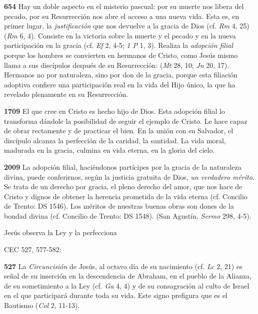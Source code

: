 \textbf{654} Hay un doble aspecto en el misterio pascual: por su muerte nos libera del pecado, por su Resurrección nos abre el acceso a una nueva vida. Esta es, en primer lugar, la \emph{justificación} que nos devuelve a la gracia de Dios (cf. \emph{Rm} 4, 25)  (\emph{Rm} 6, 4). Consiste en la victoria sobre la muerte y el pecado y en la nueva participación en la gracia (cf. \emph{Ef} 2, 4-5; \emph{1 P} 1, 3). Realiza la \emph{adopción filial} porque los hombres se convierten en hermanos de Cristo, como Jesús mismo llama a sus discípulos después de su Resurrección:  (\emph{Mt} 28, 10; \emph{Jn} 20, 17). Hermanos no por naturaleza, sino por don de la gracia, porque esta filiación adoptiva confiere una participación real en la vida del Hijo único, la que ha revelado plenamente en su Resurrección.

\textbf{1709} El que cree en Cristo es hecho hijo de Dios. Esta adopción filial lo transforma dándole la posibilidad de seguir el ejemplo de Cristo. Le hace capaz de obrar rectamente y de practicar el bien. En la unión con su Salvador, el discípulo alcanza la perfección de la caridad, la santidad. La vida moral, madurada en la gracia, culmina en vida eterna, en la gloria del cielo.

\textbf{2009} La adopción filial, haciéndonos partícipes por la gracia de la naturaleza divina, puede conferirnos, según la justicia gratuita de Dios, \emph{un verdadero mérito}. Se trata de un derecho por gracia, el pleno derecho del amor, que nos hace  de Cristo y dignos de obtener la herencia prometida de la vida eterna (cf. Concilio de Trento: DS 1546). Los méritos de nuestras buenas obras son dones de la bondad divina (cf. Concilio de Trento: DS 1548).  (San Agustín, \emph{Sermo} 298, 4-5).

Jesús observa la Ley y la perfecciona

CEC 527, 577-582:

\textbf{527} La \emph{Circuncisión} de Jesús, al octavo día de su nacimiento (cf. \emph{Lc} 2, 21) es señal de su inserción en la descendencia de Abraham, en el pueblo de la Alianza, de su sometimiento a la Ley (cf. \emph{Ga} 4, 4) y de su consagración al culto de Israel en el que participará durante toda su vida. Este signo prefigura  que es el Bautismo (\emph{Col} 2, 11-13).

